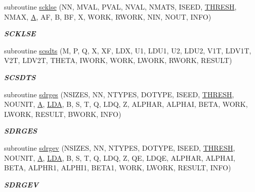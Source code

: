 \begin{DoxyCompactItemize}
subroutine \hyperlink{group__single__eig_gab468002a1d34c94fa7185710bac534a3}{scklse} (N\+N, M\+V\+A\+L, P\+V\+A\+L, N\+V\+A\+L, N\+M\+A\+T\+S, I\+S\+E\+E\+D, \hyperlink{zlaqgs_8c_a0656018abfc9fa2821827415f5d5ea57}{T\+H\+R\+E\+S\+H}, N\+M\+A\+X, \hyperlink{classA}{A}, A\+F, B, B\+F, X, W\+O\+R\+K, R\+W\+O\+R\+K, N\+I\+N, N\+O\+U\+T, I\+N\+F\+O)
\begin{DoxyCompactList}\small\item\em {\bfseries S\+C\+K\+L\+S\+E} \end{DoxyCompactList}\item 
subroutine \hyperlink{group__single__eig_ga78ceb344e13f1336e85930c14689975f}{scsdts} (M, P, Q, X, X\+F, L\+D\+X, U1, L\+D\+U1, U2, L\+D\+U2, V1\+T, L\+D\+V1\+T, V2\+T, L\+D\+V2\+T, T\+H\+E\+T\+A, I\+W\+O\+R\+K, W\+O\+R\+K, L\+W\+O\+R\+K, R\+W\+O\+R\+K, R\+E\+S\+U\+L\+T)
\begin{DoxyCompactList}\small\item\em {\bfseries S\+C\+S\+D\+T\+S} \end{DoxyCompactList}\item 
subroutine \hyperlink{group__single__eig_gaf011c82fb3efb201f7568fe7acac6d3b}{sdrges} (N\+S\+I\+Z\+E\+S, N\+N, N\+T\+Y\+P\+E\+S, D\+O\+T\+Y\+P\+E, I\+S\+E\+E\+D, \hyperlink{zlaqgs_8c_a0656018abfc9fa2821827415f5d5ea57}{T\+H\+R\+E\+S\+H}, N\+O\+U\+N\+I\+T, \hyperlink{classA}{A}, \hyperlink{example__user_8c_ae946da542ce0db94dced19b2ecefd1aa}{L\+D\+A}, B, S, T, Q, L\+D\+Q, Z, A\+L\+P\+H\+A\+R, A\+L\+P\+H\+A\+I, B\+E\+T\+A, W\+O\+R\+K, L\+W\+O\+R\+K, R\+E\+S\+U\+L\+T, B\+W\+O\+R\+K, I\+N\+F\+O)
\begin{DoxyCompactList}\small\item\em {\bfseries S\+D\+R\+G\+E\+S} \end{DoxyCompactList}\item 
subroutine \hyperlink{group__single__eig_gae07927c6321c12cd0d92450eaa21ea9c}{sdrgev} (N\+S\+I\+Z\+E\+S, N\+N, N\+T\+Y\+P\+E\+S, D\+O\+T\+Y\+P\+E, I\+S\+E\+E\+D, \hyperlink{zlaqgs_8c_a0656018abfc9fa2821827415f5d5ea57}{T\+H\+R\+E\+S\+H}, N\+O\+U\+N\+I\+T, \hyperlink{classA}{A}, \hyperlink{example__user_8c_ae946da542ce0db94dced19b2ecefd1aa}{L\+D\+A}, B, S, T, Q, L\+D\+Q, Z, Q\+E, L\+D\+Q\+E, A\+L\+P\+H\+A\+R, A\+L\+P\+H\+A\+I, B\+E\+T\+A, A\+L\+P\+H\+R1, A\+L\+P\+H\+I1, B\+E\+T\+A1, W\+O\+R\+K, L\+W\+O\+R\+K, R\+E\+S\+U\+L\+T, I\+N\+F\+O)
\begin{DoxyCompactList}\small\item\em {\bfseries S\+D\+R\+G\+E\+V} \end{DoxyCompactList}\item 

\end{DoxyCompactItemize}
